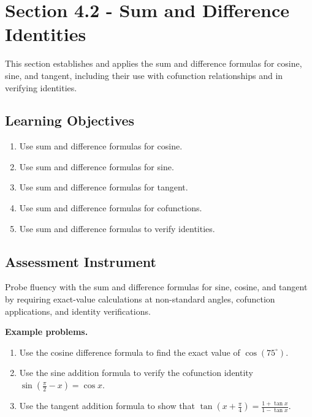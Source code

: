 \section{Section 4.2 - Sum and Difference Identities}
\label{sec:sect-8465}

This section establishes and applies the sum and difference formulas for cosine, sine, and
tangent, including their use with cofunction relationships and in verifying identities.

\subsection{Learning Objectives}
\label{ssec:lear-fe6e}

\begin{enumerate}
    \item Use sum and difference formulas for cosine.
    \item Use sum and difference formulas for sine.
    \item Use sum and difference formulas for tangent.
    \item Use sum and difference formulas for cofunctions.
    \item Use sum and difference formulas to verify identities.
\end{enumerate}

\subsection{Assessment Instrument}
\label{ssec:asse-3669}

Probe fluency with the sum and difference formulas for sine, cosine, and tangent by
requiring exact-value calculations at non-standard angles, cofunction applications, and
identity verifications.

\textbf{Example problems.}
\begin{enumerate}
    \item Use the cosine difference formula to find the exact value of $\cos(75^{\circ})$.
    \item Use the sine addition formula to verify the cofunction identity $\sin\!\left(\frac{\pi}{2} - x\right) = \cos x$.
    \item Use the tangent addition formula to show that $\tan\!\left(x + \frac{\pi}{4}\right) = \frac{1 + \tan x}{1 - \tan x}$.
\end{enumerate}

